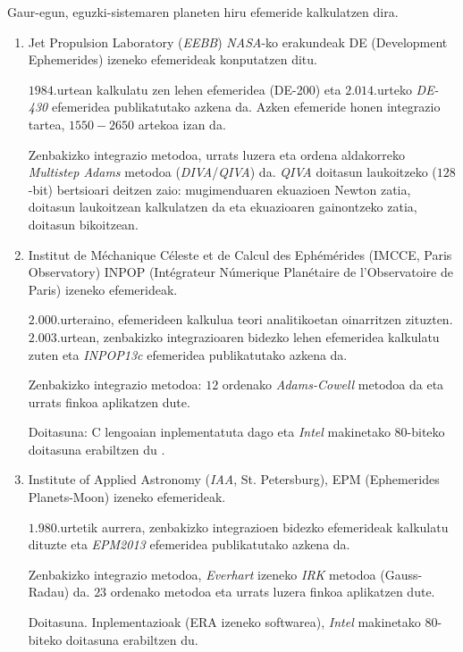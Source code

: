 Gaur-egun, eguzki-sistemaren planeten hiru efemeride kalkulatzen dira.
\begin{enumerate}
\item Jet Propulsion Laboratory (\emph{EEBB}) \emph{NASA}-ko erakundeak DE (Development Ephemerides) izeneko efemerideak konputatzen ditu.

      $1984$.urtean kalkulatu zen lehen efemeridea (DE-200) eta $2.014$.urteko \emph{DE-430} \cite{Folkner2014} efemeridea publikatutako azkena da. Azken efemeride honen integrazio tartea, $1550-2650$ artekoa izan da.

      Zenbakizko integrazio metodoa, urrats luzera eta  ordena aldakorreko \emph{Multistep Adams} metodoa \cite{Krogh1997} (\emph{DIVA}/\emph{QIVA}) da. \emph{QIVA} doitasun laukoitzeko ($128$-bit) bertsioari deitzen zaio: mugimenduaren ekuazioen Newton zatia, doitasun laukoitzean kalkulatzen da eta ekuazioaren gainontzeko zatia, doitasun bikoitzean.

\item Institut de Méchanique Céleste et de Calcul des Ephémérides (IMCCE, Paris Observatory) INPOP (Intégrateur Númerique Planétaire de l'Observatoire de Paris) izeneko efemerideak.
      
      $2.000$.urteraino, efemerideen kalkulua teori analitikoetan oinarritzen zituzten. $2.003$.urtean, zenbakizko integrazioaren bidezko lehen efemeridea kalkulatu zuten eta \emph{INPOP13c} efemeridea \cite[$2.014$]{Fienga2008} publikatutako azkena da.
           
	  Zenbakizko integrazio metodoa: $12$ ordenako \emph{Adams-Cowell} metodoa da eta urrats finkoa aplikatzen dute.
	  
	  Doitasuna: C lengoaian inplementatuta dago eta \emph{Intel} makinetako $80$-biteko doitasuna erabiltzen du \cite{Fienga2008}.  
	  
  
\item Institute of Applied Astronomy (\emph{IAA}, St. Petersburg), EPM (Ephemerides Planets-Moon) izeneko efemerideak.
      
      $1.980$.urtetik aurrera, zenbakizko integrazioen bidezko efemerideak kalkulatu dituzte eta  \emph{EPM2013} efemeridea \cite[2.014]{Pitjeva2014} publikatutako azkena  da.
      
      Zenbakizko integrazio metodoa, \emph{Everhart} izeneko \emph{IRK} metodoa (Gauss-Radau) da. $23$ ordenako metodoa eta urrats luzera finkoa aplikatzen dute.
            
      Doitasuna. Inplementazioak (ERA izeneko softwarea), \emph{Intel} makinetako $80$-biteko doitasuna erabiltzen du.
      
\end{enumerate}


